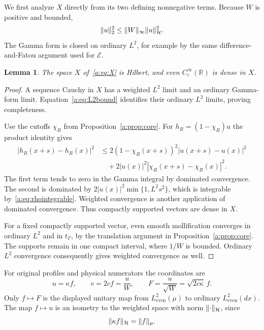 \documentclass[11pt,a4paper]{article}
\numberwithin{equation}{section}
\newtheorem{lemma}[theorem]{Lemma}
\theoremstyle{definition}\newtheorem{definition}[theorem]{Definition}
\theoremstyle{remark}\newtheorem{remark}[theorem]{Remark}
\newcommand{\R}{\mathbb R}\newcommand{\C}{\mathbb C}\newcommand{\N}{\mathbb N}
\newcommand{\E}{\mathcal E}\newcommand{\D}{\mathcal D}
\newcommand{\He}{L^2_{\mathrm{even}}(\mu)}\newcommand{\Le}{L^2_{\mathrm{even}}(dx)}
\newcommand{\Hh}{\mathcal H}\newcommand{\Hw}{\mathcal H}
\newcommand{\tg}{t_\Gamma}\newcommand{\cg}{c_\Gamma}
\begin{document}
We first analyze $X$ directly from its two defining nonnegative terms. Because $W$ is positive and bounded,
\begin{equation}\label{a:eq:L2bound}
 \norm{u}_2^2\le\norm{W}_\infty\norm{u}_{\Hh}^2.
\end{equation}
The Gamma form is closed on ordinary $L^2$, for example by the same difference-and-Fatou argument used for $\E$.

\begin{lemma}\label{a:lem:Xcore}
The space $X$ of~\eqref{a:eq:X} is Hilbert, and even $C_c^\infty(\R)$ is dense in $X$.
\end{lemma}
\begin{proof}
A sequence Cauchy in $X$ has a weighted $L^2$ limit and an ordinary Gamma-form limit. Equation~\eqref{a:eq:L2bound} identifies their ordinary $L^2$ limits, proving completeness.

Use the cutoffs $\chi_R$ from Proposition~\ref{a:prop:core}. For $h_R=(1-\chi_R)u$ the product identity gives
\begin{align*}
 |h_R(x+s)-h_R(x)|^2
 &\le2(1-\chi_R(x+s))^2|u(x+s)-u(x)|^2\\
 &\quad+2|u(x)|^2|\chi_R(x+s)-\chi_R(x)|^2.
\end{align*}
The first term tends to zero in the Gamma integral by dominated convergence. The second is dominated by
$2|u(x)|^2\min\{1,L^2s^2\}$, which is integrable by~\eqref{a:eq:rhointegrable}. Weighted convergence is another application of dominated convergence. Thus compactly supported vectors are dense in $X$.

For a fixed compactly supported vector, even smooth mollification converges in ordinary $L^2$ and in $\tg$, by the translation argument in Proposition~\ref{a:prop:core}. The supports remain in one compact interval, where $1/W$ is bounded. Ordinary $L^2$ convergence consequently gives weighted convergence as well.
\end{proof}

For original profiles and physical numerators the coordinates are
\begin{equation}\label{a:eq:coordinates}
 u=\kappa f,\qquad v=2cf=\frac uW,\qquad
 F=\frac u{\sqrt W}=\sqrt{2c\kappa}\,f.
\end{equation}
Only $f\mapsto F$ is the displayed unitary map from $\He$ to ordinary $\Le$. The map $f\mapsto u$ is an isometry to the weighted space with norm $\norm{\cdot}_{\Hh}$, since
\begin{equation}\label{a:eq:weightedidentity}
 \norm{\kappa f}_{\Hh}=\norm{f}_\mu.
\end{equation}
\end{document}
